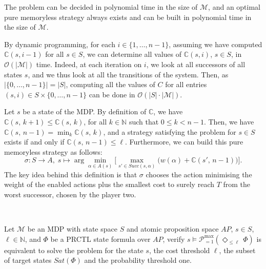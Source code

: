 \begin{theorem} The \SPG{} problem can be decided in polynomial time in the size of $\mathcal{M}$, and %
an optimal pure memoryless strategy always exists and can be built in polynomial time in the size of $\mathcal{M}$.
\end{theorem}
\begin{proof2}
By dynamic programming,
for each $i \in \{ 1, \dots, n-1 \}$, assuming we have computed $\mathbb{C}(s, i-1)$ for all $s \in S$, we can determine all values of $\mathbb{C}(s, i)$, $s \in S$, in $\mathcal{O}(|\mathcal{M}|)$ time.
Indeed, at each iteration on $i$, we look at all successors of all states $s$, and we thus look at all the transitions of the system.
Then, as $|\{0, \dots, n-1\}| = |S|$, computing all the values of $C$ for all entries $(s, i) \in S \times \{0, \dots, n-1\}$ can be done in $\mathcal{O}(|S| \cdot |\mathcal{M}|)$.
\par
Let $s$ be a state of the MDP. By definition of $\mathbb{C}$, we have $\mathbb{C}(s,\, k + 1) \leq \mathbb{C}(s,\, k)$, for all $k \in \mathbb{N}$ such that $0 \leq k < n-1$.
Then, we have $\mathbb{C}(s, \, n-1) = \min_{k} \mathbb{C}(s, \, k)$, and
a strategy satisfying the \SPG{} problem for $s \in S$ exists if and only if $\mathbb{C}(s,\, n-1) \leq \ell$.
Furthermore, we can build this pure memoryless strategy as follows:
\[
  \sigma : S \rightarrow A, \; s \mapsto \arg \min_{\alpha \in A(s)} \big[ \max_{s' \in Succ(s, \alpha)} \big(w(\alpha) + \mathbb{C}(s',\, n - 1) \big) \big].
\]
The key idea behind this definition is that $\sigma$ chooses the action minimising the weight of the enabled actions plus the smallest cost to surely reach $T$ from the worst successor, chosen by the player two.

\end{proof2}
$ $\\

\begin{remark}
  Let $\mathcal{M}$ be an MDP with state space $S$ and atomic proposition space $AP$, $s \in S$, $\ell \in \mathbb{N}$, and $\Phi$ be a PRCTL state formula over $AP$,
  verify $s \models \mathcal{P}^{\max}_{=1}(\Diamond_{\leq \ell}\, \Phi)$ is equivalent to solve the \SPG{} problem for the state $s$, the cost threshold $\ell$, the subset of target states $Sat(\Phi)$ and the probability threshold one.
\end{remark}

